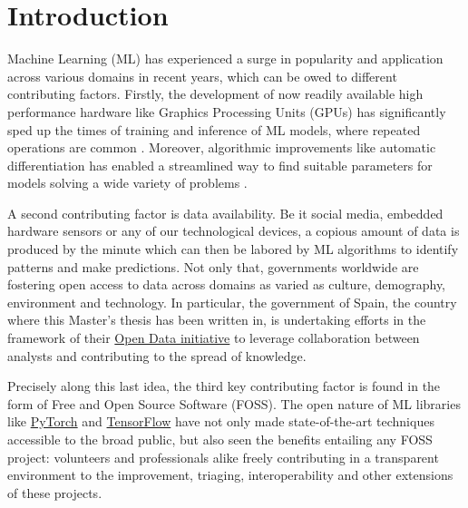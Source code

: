 \documentclass[12pt]{report} %
\begin{document}
\newpage %
\thispagestyle{empty}
\mbox{}


\clearpage
{} %

\chapter{Introduction}

Machine Learning (ML) has experienced a surge in popularity and application across various
domains in recent years, which can be owed to different contributing factors.
Firstly, the development of now readily available high performance hardware like
Graphics Processing Units (GPUs) has significantly sped up the times of training
and inference of ML models, where
repeated operations are common \cite{oh2004gpu}.
Moreover, algorithmic improvements like automatic differentiation has enabled a streamlined
way to find suitable parameters for models solving a wide variety of problems
\cite{baydin2018automatic}.

A second contributing factor is data availability. Be it social media,
embedded hardware sensors or any of our technological devices, a copious amount of data
is produced
by the minute which can then be labored by ML algorithms to identify patterns and
make predictions. Not only that, governments worldwide are fostering open access to
data across domains as varied as culture, demography, environment and technology.
In particular, the government of Spain, the country where this Master's thesis has been
written in, is undertaking efforts in the framework of their
\href{https://datos.gob.es/en}{Open Data initiative} to leverage collaboration between
analysts and contributing to the spread of knowledge.

Precisely along this last idea, the third key contributing factor is found in the form
of Free and Open Source Software (FOSS). The open nature of ML libraries like
\href{https://pytorch.org/}{PyTorch} and \href{https://www.tensorflow.org/}{TensorFlow}
have not only made state-of-the-art
techniques accessible to the broad public, but also seen the benefits entailing any FOSS
project: volunteers and professionals alike freely
contributing in a transparent environment
to the improvement, triaging, interoperability and other extensions of these projects.
\end{document}
